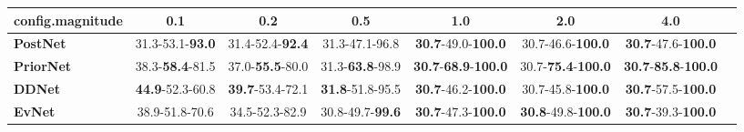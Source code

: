 \begin{tabular}{lccccccc}
\toprule
\textbf{config.magnitude} &                      0.1 &                      0.2 &                      0.5 &                                         1.0 &                                2.0 &                                         4.0 \\
\midrule
\textbf{PostNet } &  31.3-53.1-\textbf{93.0} &  31.4-52.4-\textbf{92.4} &           31.3-47.1-96.8 &           \textbf{30.7}-49.0-\textbf{100.0} &           30.7-46.6-\textbf{100.0} &           \textbf{30.7}-47.6-\textbf{100.0} \\
\textbf{PriorNet} &  38.3-\textbf{58.4}-81.5 &  37.0-\textbf{55.5}-80.0 &  31.3-\textbf{63.8}-98.9 &  \textbf{30.7}-\textbf{68.9}-\textbf{100.0} &  30.7-\textbf{75.4}-\textbf{100.0} &  \textbf{30.7}-\textbf{85.8}-\textbf{100.0} \\
\textbf{DDNet   } &  \textbf{44.9}-52.3-60.8 &  \textbf{39.7}-53.4-72.1 &  \textbf{31.8}-51.8-95.5 &           \textbf{30.7}-46.2-\textbf{100.0} &           30.7-45.8-\textbf{100.0} &           \textbf{30.7}-57.5-\textbf{100.0} \\
\textbf{EvNet   } &           38.9-51.8-70.6 &           34.5-52.3-82.9 &  30.8-49.7-\textbf{99.6} &           \textbf{30.7}-47.3-\textbf{100.0} &  \textbf{30.8}-49.8-\textbf{100.0} &           \textbf{30.7}-39.3-\textbf{100.0} \\
\bottomrule
\end{tabular}
